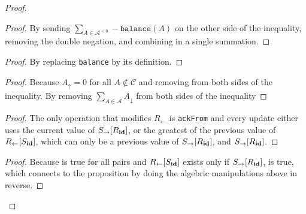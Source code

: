\documentclass[9pt]{article}   	%
\begin{document}
\begin{proof}
	
\pf~	
	\begin{proof}
		By sending  $\sum\limits_{A \in \mathcal{A}^{< 0}}  -\texttt{balance}(A)$ on the other side of the inequality, removing the double negation, and combining in a single summation.
	\end{proof}
	
	\begin{proof}
		By replacing \texttt{balance} by its definition.
	\end{proof}
	
	\begin{proof}
		Because $A_\uparrow = 0$ for all $A \notin \mathcal{C}$ and removing from both sides of the inequality. By removing $\sum\limits_{A \in \mathcal{A}} A_\downarrow$ from both sides of the inequality
	\end{proof}
	
		
	\begin{proof}
		The only operation that modifies $R_{\leftarrow}$ is \texttt{ackFrom} and every update either uses the current value of $S_{\rightarrow}[R_{\scriptsize \textbf{id}}]$, or the greatest of the previous value of  $R_{\leftarrow}[S_{\scriptsize \textbf{id}}]$, which can only be a previous value of  $S_{\rightarrow}[R_{\scriptsize \textbf{id}}]$, and $S_{\rightarrow}[R_{\scriptsize \textbf{id}}]$.
	\end{proof}
	
	\qedstep
	\begin{proof}
		Because  is true for all pairs and $R_{\leftarrow}[S_{\scriptsize \textbf{id}}]$ exists only if $S_{\rightarrow}[R_{\scriptsize \textbf{id}}]$,  is true, which connects to the proposition by doing the algebric manipulations above in reverse.
	\end{proof}
\end{proof}
\end{document}
